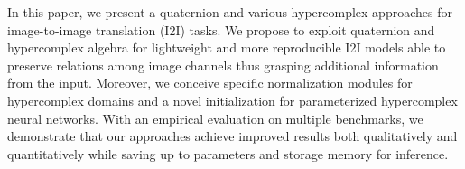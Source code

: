 \documentclass[conference]{IEEEtran}
\begin{document}
In this paper, we present a quaternion and various hypercomplex approaches for image-to-image translation (I2I) tasks. We propose to exploit quaternion and hypercomplex algebra for lightweight and more reproducible I2I models able to preserve relations among image channels thus grasping additional information from the input. Moreover, we conceive specific normalization modules for hypercomplex domains and a novel initialization for parameterized hypercomplex neural networks. With an empirical evaluation on multiple benchmarks, we demonstrate that our approaches achieve improved results both qualitatively and quantitatively while saving up to  parameters and storage memory for inference.



\end{document}
